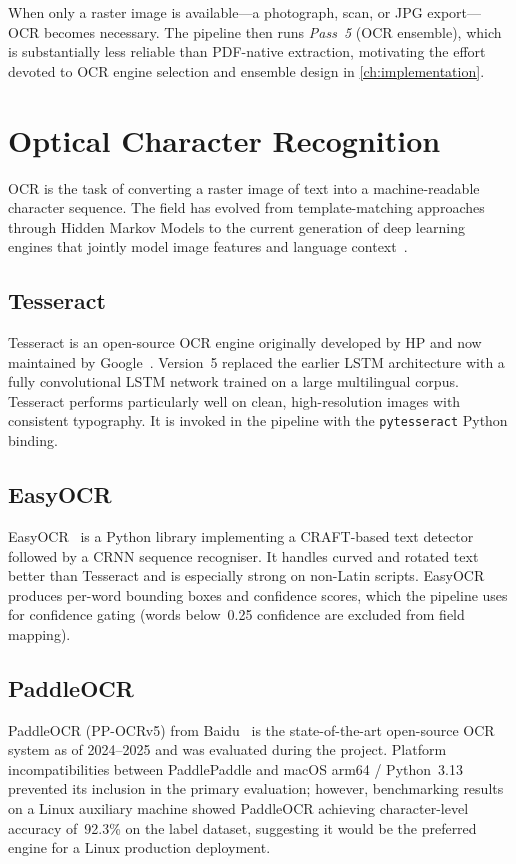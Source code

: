 When only a raster image is available—a photograph, scan, or JPG export—\ac{OCR} becomes
necessary. The pipeline then runs \emph{Pass~5} (OCR ensemble), which is substantially
less reliable than PDF-native extraction, motivating the effort devoted to OCR engine
selection and ensemble design in \cref{ch:implementation}.

\section{Optical Character Recognition}

\ac{OCR} is the task of converting a raster image of text into a machine-readable character
sequence. The field has evolved from template-matching approaches through Hidden Markov
Models to the current generation of deep learning engines that jointly model image features
and language context~\cite{shi2016end}.

\subsection{Tesseract}

Tesseract is an open-source \ac{OCR} engine originally developed by HP and now maintained
by Google~\cite{smith2007tesseract}. Version~5 replaced the earlier LSTM architecture with
a fully convolutional LSTM network trained on a large multilingual corpus. Tesseract performs
particularly well on clean, high-resolution images with consistent typography. It is invoked
in the pipeline with the \texttt{pytesseract} Python binding.

\subsection{EasyOCR}

EasyOCR~\cite{easyocr2020} is a Python library implementing a CRAFT-based text detector
followed by a CRNN sequence recogniser. It handles curved and rotated text better than
Tesseract and is especially strong on non-Latin scripts. EasyOCR produces per-word
bounding boxes and confidence scores, which the pipeline uses for confidence gating
(words below~0.25 confidence are excluded from field mapping).

\subsection{PaddleOCR}

PaddleOCR (PP-OCRv5) from Baidu~\cite{du2020pp} is the state-of-the-art open-source
\ac{OCR} system as of 2024--2025 and was evaluated during the project. Platform
incompatibilities between PaddlePaddle and macOS arm64 / Python~3.13 prevented its
inclusion in the primary evaluation; however, benchmarking results on a Linux auxiliary
machine showed PaddleOCR achieving character-level accuracy of~92.3\% on the label
dataset, suggesting it would be the preferred engine for a Linux production deployment.

